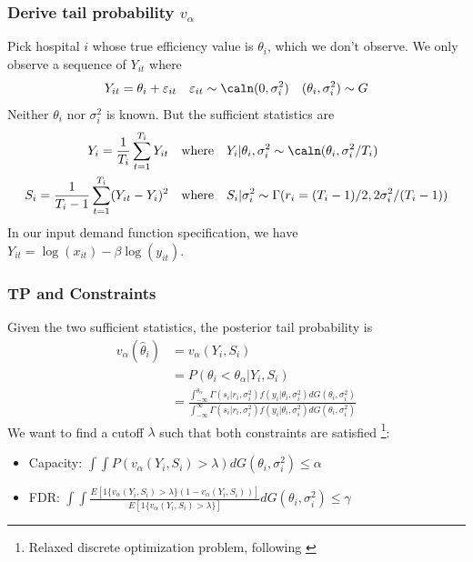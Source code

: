 \documentclass[10pt,mathserif,aspectratio=169]{beamer}
\begin{document}
\begin{frame}[label=observation]
  \frametitle{Derive tail probability $v_\alpha$}
  Pick hospital $i$ whose true efficiency value is $\theta_i$, which we don't observe. We only observe a sequence of $Y_{it}$ where
  \begin{equation*}
    Y_{it} = \theta_i + \varepsilon_{it} \quad \varepsilon_{it} \sim \caln(0,\sigma_i^2) \quad (\theta_i,\sigma_i^2) \sim G
  \end{equation*}
  Neither $\theta_i$ nor $\sigma_i^2$ is known. But the sufficient statistics are
  \begin{align*}
    Y_i=\frac{1}{T_i}\sum_{t=1}^{T_i}Y_{it}           & \quad \text{where}\quad Y_i|\theta_i,\sigma_i^2 \sim \caln(\theta_i,\sigma_i^2/T_i)     \\
    S_i=\frac{1}{T_i-1}\sum_{t=1}^{T_i}(Y_{it}-Y_i)^2 & \quad \text{where} \quad S_i|\sigma_i^2 \sim \Gamma(r_i= (T_i-1)/2,2\sigma_i^2/(T_i-1))
  \end{align*}
  In our input demand function specification, we have $Y_{it}=\log(x_{it})-\beta\log(y_{it})$. \hyperlink{normality}{}
\end{frame}

\begin{frame}
  \frametitle{TP and Constraints}
  Given the two sufficient statistics, the posterior tail probability is
  \begin{align*}
    v_\alpha(\hat{\theta}_i) & =v_\alpha(Y_i,S_i)                                                                                                         \\
                             & = P( \theta_i < \theta_{\alpha} | Y_i,S_i)                                                                                 \\
                             & = \frac{{\int_{-\infty}^{\theta_{\alpha}} \Gamma(s_i|r_i,\sigma_i^2) f(y_i|\theta_i, \sigma_i^2) dG(\theta_i,\sigma_i^2)}}
    {{\int_{-\infty}^{\infty} \Gamma(s_i|r_i,\sigma_i^2) f(y_i|\theta_i, \sigma_i^2) dG(\theta_i,\sigma_i^2)}}
  \end{align*}
  We want to find a cutoff $\lambda$ such that both constraints are satisfied \footnote{Relaxed discrete optimization problem, following \citep{basu2018weighted}}:\\
  \begin{itemize}\itemsep=8pt
    \item Capacity: $\int \int P(v_\alpha(Y_i, S_i) > \lambda) dG(\theta_i,\sigma_i^2)
            \leq \alpha$
    \item FDR: $\int \int
            \frac{E[1\{v_\alpha(Y_i,S_i)>\lambda\}(1-v_\alpha(Y_i,S_i))]}{E[1\{v_\alpha(Y_i,S_i)>\lambda\}]}
            dG(\theta_i,\sigma_i^2) \leq \gamma$
  \end{itemize}
\end{frame}
\end{document}
